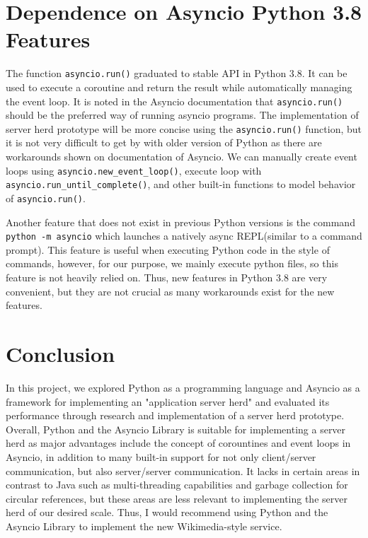 \section{Dependence on Asyncio Python 3.8 Features}
The function \texttt{asyncio.run()} graduated to stable API in Python 3.8. It can be used to execute a coroutine and return the result while automatically managing the event loop. It is noted in the Asyncio documentation that \texttt{asyncio.run()} should be the preferred way of running asyncio programs. The implementation of server herd prototype will be more concise using the \texttt{asyncio.run()} function, but it is not very difficult to get by with older version of Python as there are workarounds shown on documentation of Asyncio. We can manually create event loops using \texttt{asyncio.new\_event\_loop()}, execute loop with \texttt{asyncio.run\_until\_complete()}, and other built-in functions to model behavior of \texttt{asyncio.run()}. \par
Another feature that does not exist in previous Python versions is the command \texttt{python -m asyncio} which launches a natively async REPL(similar to a command prompt). This feature is useful when executing Python code in the style of commands, however, for our purpose, we mainly execute python files, so this feature is not heavily relied on. Thus, new features in Python 3.8 are very convenient, but they are not crucial as many workarounds exist for the new features.
\section{Conclusion}
In this project, we explored Python as a programming language and Asyncio as a framework for implementing an "application server herd" and evaluated its performance through research and implementation of a server herd prototype. Overall, Python and the Asyncio Library is suitable for implementing a server herd as major advantages include the concept of corountines and event loops in Asyncio, in addition to many built-in support for not only client/server communication, but also server/server communication. It lacks in certain areas in contrast to Java such as multi-threading capabilities and garbage collection for circular references, but these areas are less relevant to implementing the server herd of our desired scale. Thus, I would recommend using Python and the Asyncio Library to implement the new Wikimedia-style service.  
